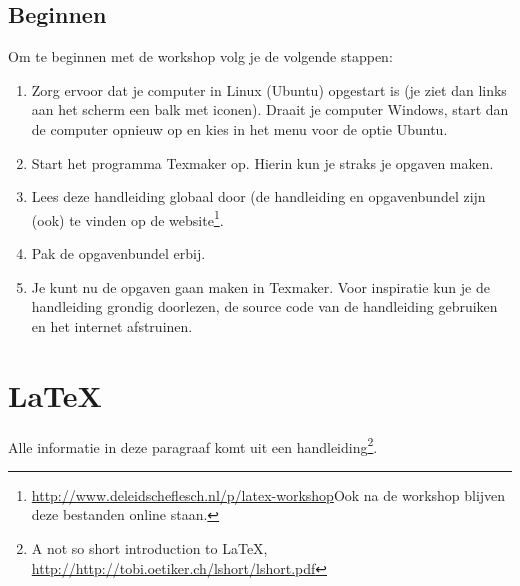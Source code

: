 \subsection{Beginnen}

Om te beginnen met de workshop volg je de volgende stappen:
\begin{enumerate}
\item Zorg ervoor dat je computer in Linux (Ubuntu) opgestart is (je ziet dan links aan het scherm een balk met iconen). Draait je computer Windows, start dan de computer opnieuw op en kies in het menu voor de optie Ubuntu.
\item Start het programma Texmaker op. Hierin kun je straks je opgaven maken.
\item Lees deze handleiding globaal door (de handleiding en opgavenbundel zijn (ook) te vinden op de website\footnote{\url{http://www.deleidscheflesch.nl/p/latex-workshop}\newline Ook na de workshop blijven deze bestanden online staan.}. 
\item Pak de opgavenbundel erbij.
\item Je kunt nu de opgaven gaan maken in Texmaker. Voor inspiratie kun je de handleiding grondig doorlezen, de source code van de handleiding gebruiken en het internet afstruinen.
\end{enumerate}

\section{\LaTeX}

Alle informatie in deze paragraaf komt uit een handleiding\footnote{A not so
short introduction to \LaTeX,
\url{http://http://tobi.oetiker.ch/lshort/lshort.pdf}}.




